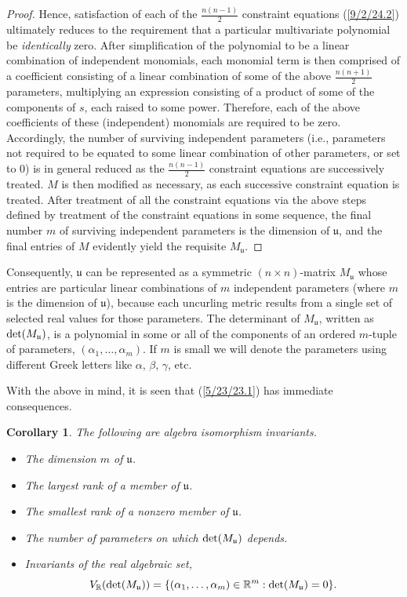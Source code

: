 \documentclass{amsart}
\numberwithin{equation}{section}
\newtheorem{corollary}[theorem]{Corollary}
\theoremstyle{definition}
\numberwithin{theorem}{section}
\begin{document}
\begin{proof}
Hence, satisfaction of each of the $\frac{n(n-1)}{2}$ constraint equations (\ref{9/2/24.2}) ultimately reduces to the requirement that a particular multivariate polynomial be {\it identically} zero.  After simplification of the polynomial to be a linear combination of independent monomials, each monomial term is then comprised of a coefficient consisting of a linear combination of some of the above $\frac{n(n+1)}{2}$ parameters, multiplying an expression consisting of a product of some of the components of $s$, each raised to some power.  Therefore, each of the above coefficients of these (independent) monomials are required to be zero.  Accordingly, the number of surviving independent parameters (i.e., parameters not required to be equated to some linear combination of other parameters, or set to 0) is in general reduced as the $\frac{n(n-1)}{2}$ constraint equations are successively treated.  $M$ is then modified as necessary, as each successive constraint equation is treated.  After treatment of all the constraint equations via the above steps defined by treatment of the constraint equations in some sequence, the final number $m$ of surviving independent parameters is the dimension of $\mathfrak{u}$, and the final entries of $M$ evidently yield the requisite $M_\mathfrak{u}$.
\end{proof}

Consequently, $\mathfrak{u}$ can be represented as a symmetric $(n\times n)$-matrix $M_{\mathfrak{u}}$ whose entries are particular linear combinations of $m$ independent parameters (where $m$ is the dimension of $\mathfrak{u}$), because each uncurling metric results from a single set of selected real values for those parameters.  The determinant of $M_{\mathfrak{u}}$, written as ${\rm det}(M_{\mathfrak{u}})$, is a polynomial in some or all of the components of an ordered $m$-tuple of parameters, $(\alpha_1,\dots,\alpha_m)$.  If $m$ is small  we will denote the parameters using different Greek letters like $\alpha$, $\beta$, $\gamma$, etc. 

   With the above in mind, it is seen that (\ref{5/23/23.1}) has immediate consequences. 
   
           
  \begin{corollary}\label{8/18/23.2} The following are algebra isomorphism invariants. \begin{itemize} \item The dimension $m$ of $\mathfrak{u}$.   \item The largest rank  of a member of $\mathfrak{u}$.  \item The smallest rank of a nonzero member of $\mathfrak{u}$. \item The number of parameters on which ${\rm det}(M_{\mathfrak{u}})$ depends. \item Invariants of the real algebraic set, \[V_\mathbb{R}({\rm det}(M_{\mathfrak{u}})) = \{(\alpha_1,\dots,\alpha_m)\in\mathbb{R}^m: {\rm det}(M_{\mathfrak{u}}) = 0 \}.\] \end{itemize} \end{corollary}
  
\end{document}
